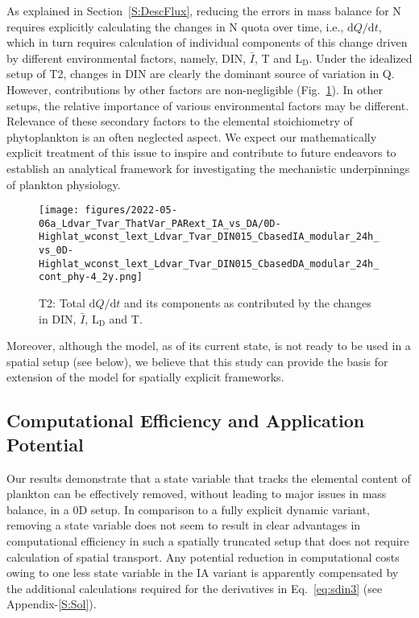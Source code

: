\documentclass[gmd, manuscript]{copernicus}
\begin{document}
As explained in Section~\ref{S:DescFlux}, reducing the errors in mass balance for N requires explicitly calculating the changes in N quota over time, i.e., $\textrm{d}Q/\textrm{d}t$, which in turn requires calculation of individual components of this change driven by different environmental factors, namely, DIN, $\bar{I}$, T and $\textrm{L}_{\textrm{D}}$.  Under the idealized setup of T2, changes in DIN are clearly the dominant source of variation in Q.  However, contributions by other factors are non-negligible (Fig.~\ref{f.T2dQdt}). In other setups, the relative importance of various environmental factors may be different. Relevance of these secondary factors to the elemental stoichiometry of phytoplankton is an often neglected aspect. We expect our mathematically explicit treatment of this issue to inspire and contribute to future endeavors to establish an analytical framework for investigating the mechanistic underpinnings of plankton physiology.

\begin{figure}[ht!]
\texttt{[image: figures/2022-05-06a\_Ldvar\_Tvar\_ThatVar\_PARext\_IA\_vs\_DA/0D-Highlat\_wconst\_lext\_Ldvar\_Tvar\_DIN015\_CbasedIA\_modular\_24h\_vs\_0D-Highlat\_wconst\_lext\_Ldvar\_Tvar\_DIN015\_CbasedDA\_modular\_24h\_cont\_phy-4\_2y.png]}
\caption{T2: Total $\textrm{d}Q/\textrm{d}t$ and its components as contributed by the changes in DIN, $\bar{I}$, $\textrm{L}_{\textrm{D}}$ and T.\label{f.T2dQdt}}
\end{figure}

Moreover, although the model, as of its current state, is not ready to be used in a spatial setup (see below), we believe that this study can provide the basis for extension of the model for spatially explicit frameworks.

\FloatBarrier
\subsection{Computational Efficiency and Application Potential}

Our results demonstrate that a state variable that tracks the elemental content of plankton can be effectively removed, without leading to major issues in mass balance, in a 0D setup. In comparison to a fully explicit dynamic variant, removing a state variable does not seem to result in clear advantages in computational efficiency in such a spatially truncated setup that does not require calculation of spatial transport. Any potential reduction in computational costs owing to one less state variable in the IA variant is apparently compensated by the additional calculations required for the derivatives in Eq.~\eqref{eq:sdin3} (see Appendix-\ref{S:Sol}).
\end{document}
